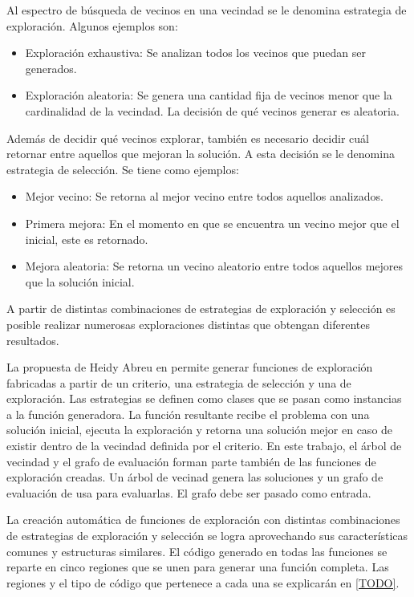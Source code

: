 Al espectro de búsqueda de vecinos en una vecindad se le denomina estrategia de exploración. Algunos ejemplos son:

\begin{itemize}
	\item Exploración exhaustiva: Se analizan todos los vecinos que puedan ser generados.
	\item Exploración aleatoria: Se genera una cantidad fija de vecinos menor que la cardinalidad de la vecindad. La decisión de qué vecinos generar es aleatoria.
\end{itemize}

Además de decidir qué vecinos explorar, también es necesario decidir cuál retornar entre aquellos que mejoran la solución. A esta decisión se le denomina estrategia de selección. Se tiene como ejemplos:

\begin{itemize}
	\item Mejor vecino: Se retorna al mejor vecino entre todos aquellos analizados.
	\item Primera mejora: En el momento en que se encuentra un vecino mejor que el inicial, este es retornado.
	\item Mejora aleatoria: Se retorna un vecino aleatorio entre todos aquellos mejores que la solución inicial.
\end{itemize}

A partir de distintas combinaciones de estrategias de exploración y selección es posible realizar numerosas exploraciones distintas que obtengan diferentes resultados.

La propuesta de Heidy Abreu en \cite{Heidy} permite generar funciones de exploración fabricadas a partir de un criterio, una estrategia de selección y una de exploración. Las estrategias se definen como clases que se pasan como instancias a la función generadora. La función resultante recibe el problema con una solución inicial, ejecuta la exploración y retorna una solución mejor en caso de existir dentro de la vecindad definida por el criterio. En este trabajo, el árbol de vecindad y el grafo de evaluación forman parte también de las funciones de exploración creadas. Un árbol de vecinad genera las soluciones y un grafo de evaluación de usa para evaluarlas. El grafo debe ser pasado como entrada.

La creación automática de funciones de exploración con distintas combinaciones de estrategias de exploración y selección se logra aprovechando sus características comunes y estructuras similares. El código generado en todas las funciones se reparte en cinco regiones que se  unen para generar una función completa. Las regiones y el tipo de código que pertenece a cada una se explicarán en \ref{TODO}.

